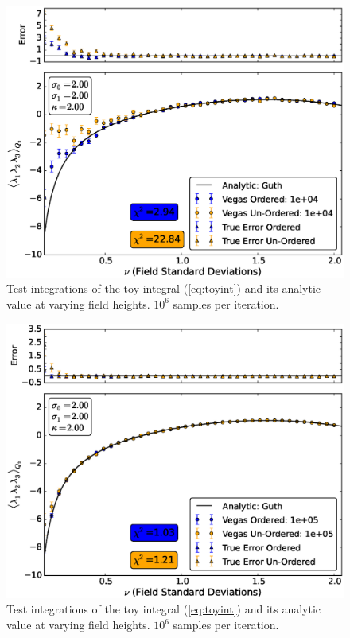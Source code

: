 \documentclass[10pt,letterpaper]{article}
\begin{document}
\begin{figure}[t] %
\centering %
\includegraphics[scale=0.45]{images/ordercomp_e4.eps} 
\caption{Test integrations of the toy integral (\ref{eq:toyint}) and its analytic value at varying field heights. $10^6$ samples per iteration.}
\label{fig:ordercomp_e4}
\end{figure}

\begin{figure}[t] %
\centering %
\includegraphics[scale=0.45]{images/ordercomp_e5.eps} 
\caption{Test integrations of the toy integral (\ref{eq:toyint}) and its analytic value at varying field heights. $10^6$ samples per iteration.}
\label{fig:ordercomp_e5}
\end{figure}
\end{document}
